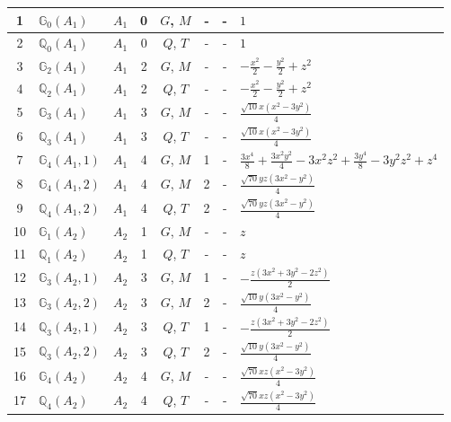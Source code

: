 \documentclass[fleqn,10pt,landscape]{jsarticle}
\begin{document}
\begin{longtable}[l]{clcccccl}
1 & $\mathbb{G}_{0}(A_{1})$ & $A_{1}$ & 0 & $G$, $M$ & - & - & $1$ \\ \hline
2 & $\mathbb{Q}_{0}(A_{1})$ & $A_{1}$ & 0 & $Q$, $T$ & - & - & $1$ \\ \hline
3 & $\mathbb{G}_{2}(A_{1})$ & $A_{1}$ & 2 & $G$, $M$ & - & - & $- \frac{x^{2}}{2} - \frac{y^{2}}{2} + z^{2}$ \\ \hline
4 & $\mathbb{Q}_{2}(A_{1})$ & $A_{1}$ & 2 & $Q$, $T$ & - & - & $- \frac{x^{2}}{2} - \frac{y^{2}}{2} + z^{2}$ \\ \hline
5 & $\mathbb{G}_{3}(A_{1})$ & $A_{1}$ & 3 & $G$, $M$ & - & - & $\frac{\sqrt{10} x \left(x^{2} - 3 y^{2}\right)}{4}$ \\ \hline
6 & $\mathbb{Q}_{3}(A_{1})$ & $A_{1}$ & 3 & $Q$, $T$ & - & - & $\frac{\sqrt{10} x \left(x^{2} - 3 y^{2}\right)}{4}$ \\ \hline
7 & $\mathbb{G}_{4}(A_{1},1)$ & $A_{1}$ & 4 & $G$, $M$ & 1 & - & $\frac{3 x^{4}}{8} + \frac{3 x^{2} y^{2}}{4} - 3 x^{2} z^{2} + \frac{3 y^{4}}{8} - 3 y^{2} z^{2} + z^{4}$ \\ \hline
8 & $\mathbb{G}_{4}(A_{1},2)$ & $A_{1}$ & 4 & $G$, $M$ & 2 & - & $\frac{\sqrt{70} y z \left(3 x^{2} - y^{2}\right)}{4}$ \\ \hline
9 & $\mathbb{Q}_{4}(A_{1},2)$ & $A_{1}$ & 4 & $Q$, $T$ & 2 & - & $\frac{\sqrt{70} y z \left(3 x^{2} - y^{2}\right)}{4}$ \\ \hline
10 & $\mathbb{G}_{1}(A_{2})$ & $A_{2}$ & 1 & $G$, $M$ & - & - & $z$ \\ \hline
11 & $\mathbb{Q}_{1}(A_{2})$ & $A_{2}$ & 1 & $Q$, $T$ & - & - & $z$ \\ \hline
12 & $\mathbb{G}_{3}(A_{2},1)$ & $A_{2}$ & 3 & $G$, $M$ & 1 & - & $- \frac{z \left(3 x^{2} + 3 y^{2} - 2 z^{2}\right)}{2}$ \\ \hline
13 & $\mathbb{G}_{3}(A_{2},2)$ & $A_{2}$ & 3 & $G$, $M$ & 2 & - & $\frac{\sqrt{10} y \left(3 x^{2} - y^{2}\right)}{4}$ \\ \hline
14 & $\mathbb{Q}_{3}(A_{2},1)$ & $A_{2}$ & 3 & $Q$, $T$ & 1 & - & $- \frac{z \left(3 x^{2} + 3 y^{2} - 2 z^{2}\right)}{2}$ \\ \hline
15 & $\mathbb{Q}_{3}(A_{2},2)$ & $A_{2}$ & 3 & $Q$, $T$ & 2 & - & $\frac{\sqrt{10} y \left(3 x^{2} - y^{2}\right)}{4}$ \\ \hline
16 & $\mathbb{G}_{4}(A_{2})$ & $A_{2}$ & 4 & $G$, $M$ & - & - & $\frac{\sqrt{70} x z \left(x^{2} - 3 y^{2}\right)}{4}$ \\ \hline
17 & $\mathbb{Q}_{4}(A_{2})$ & $A_{2}$ & 4 & $Q$, $T$ & - & - & $\frac{\sqrt{70} x z \left(x^{2} - 3 y^{2}\right)}{4}$ \\ \hline

\end{longtable}
\end{document}
